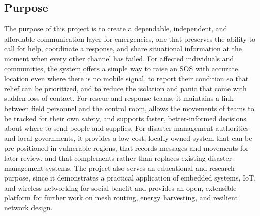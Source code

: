 \subsection{Purpose}
The purpose of this project is to create a dependable, independent, and affordable communication layer for emergencies, one that preserves the ability to call for help, coordinate a response, and share situational information at the moment when every other channel has failed. For affected individuals and communities, the system offers a simple way to raise an SOS with accurate location even where there is no mobile signal, to report their condition so that relief can be prioritized, and to reduce the isolation and panic that come with sudden loss of contact. For rescue and response teams, it maintains a link between field personnel and the control room, allows the movements of teams to be tracked for their own safety, and supports faster, better-informed decisions about where to send people and supplies. For disaster-management authorities and local governments, it provides a low-cost, locally owned system that can be pre-positioned in vulnerable regions, that records messages and movements for later review, and that complements rather than replaces existing disaster-management systems. The project also serves an educational and research purpose, since it demonstrates a practical application of embedded systems, IoT, and wireless networking for social benefit and provides an open, extensible platform for further work on mesh routing, energy harvesting, and resilient network design.
